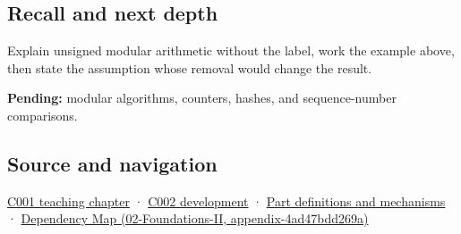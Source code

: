 \subsection{Recall and next depth}\label{appendix-c99977d88b33-recall-and-next-depth}

Explain unsigned modular arithmetic without the label, work the example above, then state the assumption whose removal would change the result.

\textbf{Pending:} modular algorithms, counters, hashes, and sequence-number comparisons.

\subsection{Source and navigation}\label{appendix-c99977d88b33-source-and-navigation}

\hyperref[01-foundations-i-ch001-from-a-signal-to-an-interpretation]{C001 teaching chapter} · \hyperref[01-foundations-i-ch001-arithmetic-becomes-a-policy]{C002 development} · \hyperref[appendix-fd090d982a15]{Part definitions and mechanisms} · \href{../02-Foundations-II/main.pdf\#nameddest=appendix-4ad47bdd269a}{Dependency Map (02-Foundations-II, appendix-4ad47bdd269a)}
